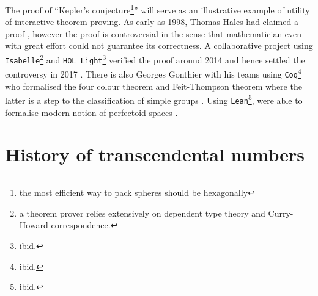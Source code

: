 \documentclass{report}
\theoremstyle{definition}
\begin{document}
The proof of ``Kepler's conjecture\footnote{the most efficient way to pack spheres should be hexagonally}'' will serve as an illustrative example of utility of interactive theorem proving. As early as 1998, Thomas Hales had claimed a proof \cite{hales1998kepler,harrison2014history}, however the proof is controversial in the sense that mathematician even with great effort could not guarantee its correctness. A collaborative project using {\tt \small Isabelle}\footnote{a theorem prover relies extensively on dependent type theory and Curry-Howard correspondence.} and {\tt \small HOL Light}\footnote{ibid.} verified the proof around 2014 and hence settled the controversy in 2017 \cite{hales2017formal}. There is also Georges Gonthier with his teams using {\tt \small Coq}\footnote{ibid.} who formalised the four colour theorem and Feit-Thompson theorem where the latter is a step to the classification of simple groups \cite{gonthier2008formal, gonthier2013machine}. Using {\tt \small Lean}\footnote{ibid.},  were able to formalise modern notion of perfectoid spaces \cite{buzzard2020formalising}.

\section{History of transcendental numbers}
\end{document}
